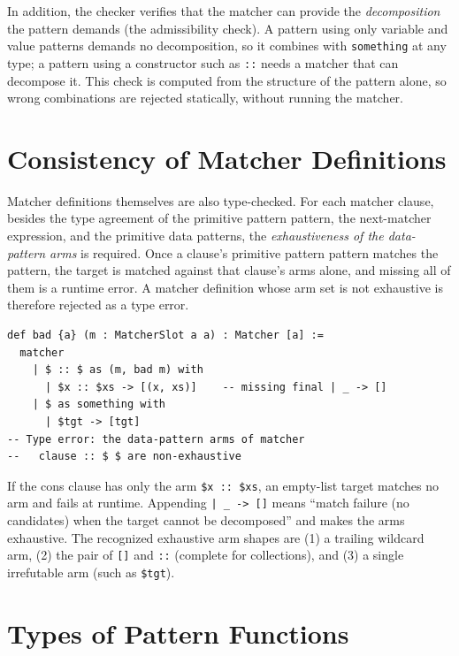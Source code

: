 In addition, the checker verifies that the matcher can provide the \emph{decomposition} the pattern demands (the admissibility check).
A pattern using only variable and value patterns demands no decomposition, so it combines with \lstinline{something} at any type; a pattern using a constructor such as \lstinline{::} needs a matcher that can decompose it.
This check is computed from the structure of the pattern alone, so wrong combinations are rejected statically, without running the matcher.

\section{Consistency of Matcher Definitions}\label{matcher-consistency}

Matcher definitions themselves are also type-checked.
For each matcher clause, besides the type agreement of the primitive pattern pattern, the next-matcher expression, and the primitive data patterns, the \emph{exhaustiveness of the data-pattern arms} is required.
Once a clause's primitive pattern pattern matches the pattern, the target is matched against that clause's arms alone, and missing all of them is a runtime error.
A matcher definition whose arm set is not exhaustive is therefore rejected as a type error.
\begin{lstlisting}[language=egison]
def bad {a} (m : MatcherSlot a a) : Matcher [a] :=
  matcher
    | $ :: $ as (m, bad m) with
      | $x :: $xs -> [(x, xs)]    -- missing final | _ -> []
    | $ as something with
      | $tgt -> [tgt]
-- Type error: the data-pattern arms of matcher
--   clause :: $ $ are non-exhaustive
\end{lstlisting}
If the cons clause has only the arm \lstinline{$x :: $xs}, an empty-list target matches no arm and fails at runtime.
Appending \lstinline{| _ -> []} means ``match failure (no candidates) when the target cannot be decomposed'' and makes the arms exhaustive.
The recognized exhaustive arm shapes are (1) a trailing wildcard arm, (2) the pair of \lstinline{[]} and \lstinline{::} (complete for collections), and (3) a single irrefutable arm (such as \lstinline{$tgt}).

\section{Types of Pattern Functions}\label{matcher-patfun-types}

